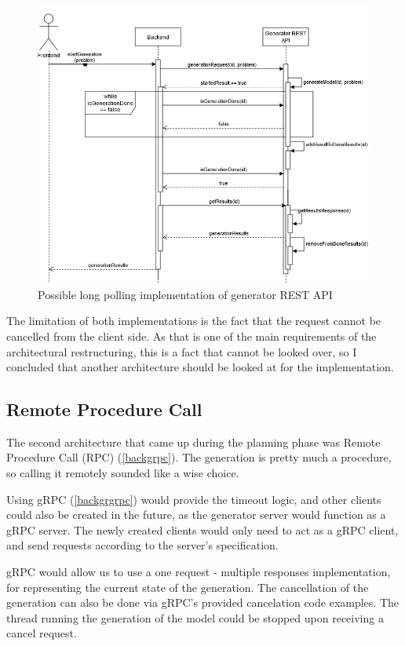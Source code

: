 \begin{itemize}
\begin{figure}
\begin{center}
				\includegraphics[scale=0.5]{include/imgs/rest_long_poll.png}
				\caption{Possible long polling implementation of generator REST API}
				\label{longpollingimage}
			\end{center}
		\end{figure}
\end{itemize}
The limitation of both implementations is the fact that the request cannot be cancelled from the client side. As that is one 
of the main requirements of the architectural restructuring, this is a fact that cannot be looked over, so I concluded that 
another architecture should be looked at for the implementation.


\subsection{Remote Procedure Call} \label{rpcconsiderations}
	The second architecture that came up during the planning phase was Remote Procedure Call (RPC) (\ref{backgrpc}). The generation is pretty much
	a procedure, so calling it remotely sounded like a wise choice. 

	Using gRPC (\ref{backgrgrpc}) would provide the timeout logic, and other clients
	could also be created in the future, as the generator server would function as a gRPC server. The newly created clients would only need to
	act as a gRPC client, and send requests according to the server's specification.

	gRPC would allow us to use a one request - multiple responses implementation, for representing the current state of the generation.
	The cancellation of the generation can also be done via gRPC's provided cancelation code examples. The thread running the generation of
	the model could be stopped upon receiving a cancel request.

